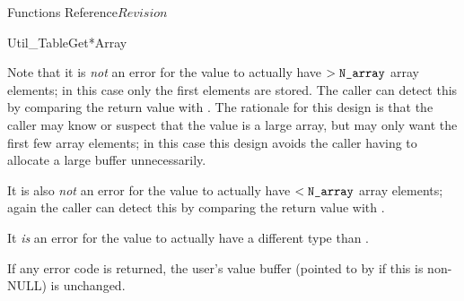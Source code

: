 \begin{cactuspart}{ Functions Reference}{}{$Revision$}
\begin{FunctionDescription}{Util\_TableGet*Array}
\begin{Discussion}
Note that it is {\em not\/} an error for the value to actually have
$> \mbox{\texttt{N\_array}}$ array elements; in this case only the first 
elements are stored.  The caller can detect this by comparing the
return value with .
The rationale for this design is that the caller may know or suspect
that the value is a large array, but may only want the first few array
elements; in this case this design avoids the caller having to allocate
a large buffer unnecessarily.

It is also {\em not\/} an error for the value to actually have
$< \mbox{\texttt{N\_array}}$ array elements; again the caller can detect this by
comparing the return value with .

It {\em is\/} an error for the value to actually have a different type
than .

If any error code is returned, the user's value buffer
(pointed to by  if this is non-NULL) is unchanged.
\end{Discussion}


\end{FunctionDescription}
\end{cactuspart}
